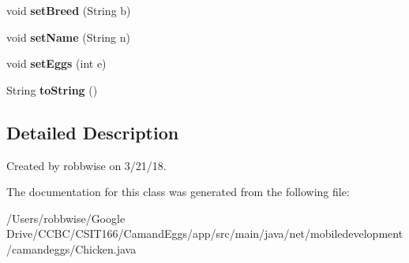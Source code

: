 \begin{DoxyCompactItemize}
void {\bfseries set\+Breed} (String b)
\item 
\mbox{\label{classnet_1_1mobiledevelopment_1_1camandeggs_1_1_chicken_a32d105215a6663638466b6686c46d846}} 
void {\bfseries set\+Name} (String n)
\item 
\mbox{\label{classnet_1_1mobiledevelopment_1_1camandeggs_1_1_chicken_ab670c03a86488a38865c8fcd6d291196}} 
void {\bfseries set\+Eggs} (int e)
\item 
\mbox{\label{classnet_1_1mobiledevelopment_1_1camandeggs_1_1_chicken_ab62786f60d359a4a3f045aa28e1f0c4d}} 
String {\bfseries to\+String} ()
\end{DoxyCompactItemize}


\subsection{Detailed Description}
Created by robbwise on 3/21/18. 

The documentation for this class was generated from the following file\+:\begin{DoxyCompactItemize}
\item 
/\+Users/robbwise/\+Google Drive/\+C\+C\+B\+C/\+C\+S\+I\+T166/\+Camand\+Eggs/app/src/main/java/net/mobiledevelopment/camandeggs/Chicken.\+java\end{DoxyCompactItemize}

